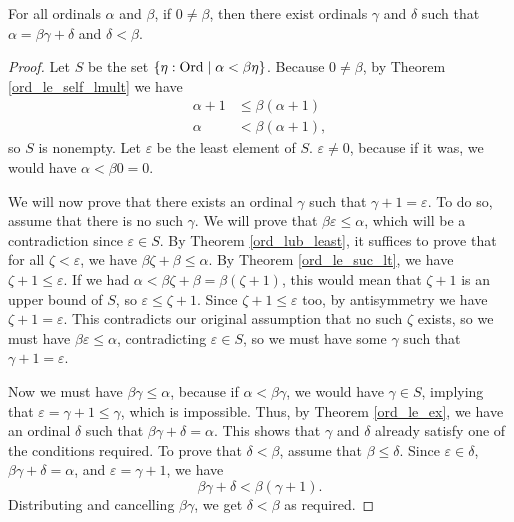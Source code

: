 \documentclass[../../math.tex]{subfiles}
\begin{document}
\begin{theorem} \label{ord_div}
    For all ordinals $\alpha$ and $\beta$, if $0 \neq \beta$, then there exist
    ordinals $\gamma$ and $\delta$ such that $\alpha = \beta \gamma + \delta$
    and $\delta < \beta$.
\end{theorem}
\begin{proof}
    Let $S$ be the set $\{\eta : \operatorname{Ord} \mid \alpha < \beta \eta\}$.  Because $0
    \neq \beta$, by Theorem \ref{ord_le_self_lmult} we have
    \begin{align*}
        \alpha + 1 &\leq \beta(\alpha + 1) \\
        \alpha &< \beta(\alpha + 1),
    \end{align*}
    so $S$ is nonempty.  Let $\varepsilon$ be the least element of $S$.
    $\varepsilon \neq 0$, because if it was, we would have $\alpha < \beta 0 =
    0$.

    We will now prove that there exists an ordinal $\gamma$ such that $\gamma +
    1 = \varepsilon$.  To do so, assume that there is no such $\gamma$.  We will
    prove that $\beta \varepsilon \leq \alpha$, which will be a contradiction
    since $\varepsilon \in S$.  By Theorem \ref{ord_lub_least}, it suffices to
    prove that for all $\zeta < \varepsilon$, we have $\beta\zeta + \beta \leq
    \alpha$.  By Theorem \ref{ord_le_suc_lt}, we have $\zeta + 1 \leq
    \varepsilon$.  If we had $\alpha < \beta\zeta + \beta = \beta(\zeta + 1)$,
    this would mean that $\zeta + 1$ is an upper bound of $S$, so $\varepsilon
    \leq \zeta + 1$.  Since $\zeta + 1 \leq \varepsilon$ too, by antisymmetry we
    have $\zeta + 1 = \varepsilon$.  This contradicts our original assumption
    that no such $\zeta$ exists, so we must have $\beta \varepsilon \leq
    \alpha$, contradicting $\varepsilon \in S$, so we must have some $\gamma$
    such that $\gamma + 1 = \varepsilon$.

    Now we must have $\beta \gamma \leq \alpha$, because if $\alpha < \beta
    \gamma$, we would have $\gamma \in S$, implying that $\varepsilon = \gamma +
    1 \leq \gamma$, which is impossible.  Thus, by Theorem \ref{ord_le_ex}, we
    have an ordinal $\delta$ such that $\beta \gamma + \delta = \alpha$.  This
    shows that $\gamma$ and $\delta$ already satisfy one of the conditions
    required.  To prove that $\delta < \beta$, assume that $\beta \leq \delta$.
    Since $\varepsilon \in \delta$, $\beta \gamma + \delta = \alpha$, and
    $\varepsilon = \gamma + 1$, we have
    \[
        \beta \gamma + \delta < \beta (\gamma + 1).
    \]
    Distributing and cancelling $\beta \gamma$, we get $\delta < \beta$ as
    required.
\end{proof}
\end{document}
